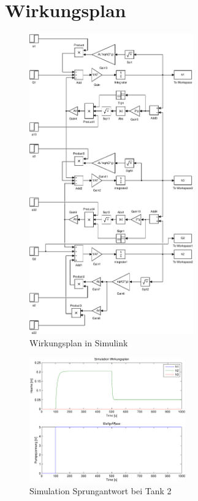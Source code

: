 \section{Wirkungsplan}
\begin{figure}[h!]
    \centering
    \includegraphics[width=0.63\textwidth]{03/wirkungsplan_mdl.pdf}
    \caption{Wirkungsplan in Simulink}
    \label{fig:03_mdl}
\end{figure}
\begin{figure}[h!]
    \centering
    \includegraphics[width=0.6\textwidth]{03/sim_0.pdf}
    \caption{Simulation Sprungantwort bei Tank 2}
    \label{fig:03_sim}
\end{figure}

